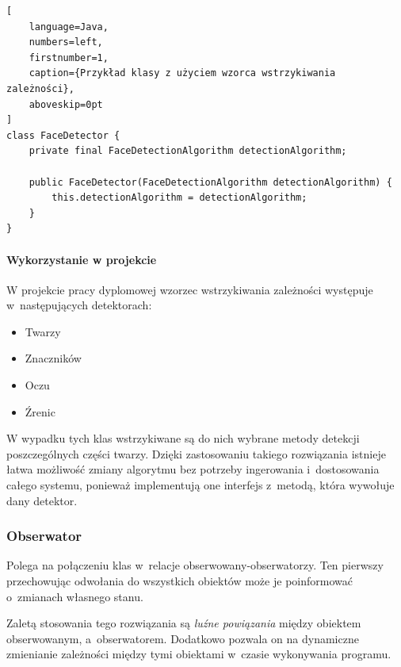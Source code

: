 \vspace{5mm}

\begin{addmargin}[10mm]{0mm}
\begin{lstlisting}[
    language=Java,
    numbers=left,
    firstnumber=1,
    caption={Przykład klasy z użyciem wzorca wstrzykiwania zależności},
    aboveskip=0pt
]
class FaceDetector {
    private final FaceDetectionAlgorithm detectionAlgorithm;
    
    public FaceDetector(FaceDetectionAlgorithm detectionAlgorithm) {
        this.detectionAlgorithm = detectionAlgorithm;
    }
}
\end{lstlisting}
\end{addmargin}


\vspace{5mm}


\paragraph{Wykorzystanie w projekcie}

W projekcie pracy dyplomowej wzorzec wstrzykiwania zależności występuje w~następujących detektorach:

\begin{itemize}
    \item Twarzy
    \item Znaczników
    \item Oczu
    \item Źrenic
\end{itemize}
    
W wypadku tych klas wstrzykiwane są do nich wybrane metody detekcji poszczególnych części twarzy. Dzięki zastosowaniu takiego rozwiązania istnieje łatwa możliwość zmiany algorytmu bez potrzeby ingerowania i~dostosowania całego systemu, ponieważ implementują one interfejs z~metodą, która wywołuje dany detektor. 
    
    
    
\subsubsection{Obserwator}

Polega na połączeniu klas w~relacje obserwowany-obserwatorzy. Ten pierwszy przechowując odwołania do wszystkich obiektów może je poinformować o~zmianach własnego stanu.

\par

Zaletą stosowania tego rozwiązania są \textit{luźne powiązania} między obiektem obserwowanym, a~obserwatorem. Dodatkowo pozwala on na dynamiczne zmienianie zależności między tymi obiektami w~czasie wykonywania programu. 


